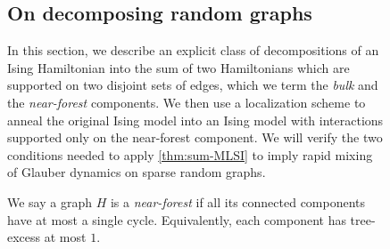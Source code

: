 \documentclass[11pt,letterpaper]{article}
\begin{document}
\begin{figure}

\subsection{On decomposing random graphs}
\label{sec:decomposition}
    In this section, we describe an explicit class of decompositions of an Ising Hamiltonian into the sum of two Hamiltonians which are supported on two disjoint sets of edges, which we term the \emph{bulk} and the \emph{near-forest} components. 
    We then use a localization scheme to anneal the original Ising model into an Ising model with interactions supported only on the near-forest component.
    We will verify the two conditions needed to apply \cref{thm:sum-MLSI} to imply rapid mixing of Glauber dynamics on sparse random graphs.

    \begin{definition}
        We say a graph $H$ is a \emph{near-forest} if all its connected components have at most a single cycle. Equivalently, each component has tree-excess at most $1$.
    \end{definition}


\end{figure}
\end{document}
